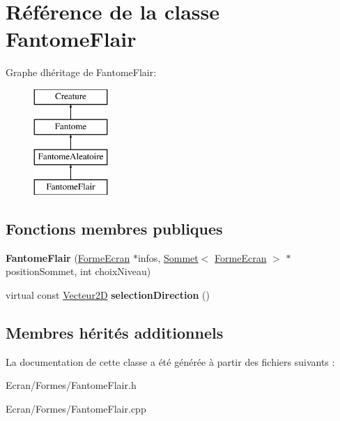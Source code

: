 \hypertarget{class_fantome_flair}{}\section{Référence de la classe Fantome\+Flair}
\label{class_fantome_flair}
Graphe d\textquotesingle{}héritage de Fantome\+Flair\+:\begin{figure}[H]
\begin{center}
\leavevmode
\includegraphics[height=4.000000cm]{class_fantome_flair}
\end{center}
\end{figure}
\subsection*{Fonctions membres publiques}
\begin{DoxyCompactItemize}
\item 
\mbox{\label{class_fantome_flair_ae3b0a86184ac3244a3a279cd3a19409e}} 
{\bfseries Fantome\+Flair} (\mbox{\hyperlink{class_forme_ecran}{Forme\+Ecran}} $\ast$infos, \mbox{\hyperlink{class_sommet}{Sommet}}$<$ \mbox{\hyperlink{class_forme_ecran}{Forme\+Ecran}} $>$ $\ast$position\+Sommet, int choix\+Niveau)
\item 
\mbox{\label{class_fantome_flair_abb15b1fe2a311bfa49a12ccf09fb5525}} 
virtual const \mbox{\hyperlink{class_vecteur2_d}{Vecteur2D}} {\bfseries selection\+Direction} ()
\end{DoxyCompactItemize}
\subsection*{Membres hérités additionnels}


La documentation de cette classe a été générée à partir des fichiers suivants \+:\begin{DoxyCompactItemize}
\item 
Ecran/\+Formes/Fantome\+Flair.\+h\item 
Ecran/\+Formes/Fantome\+Flair.\+cpp\end{DoxyCompactItemize}
